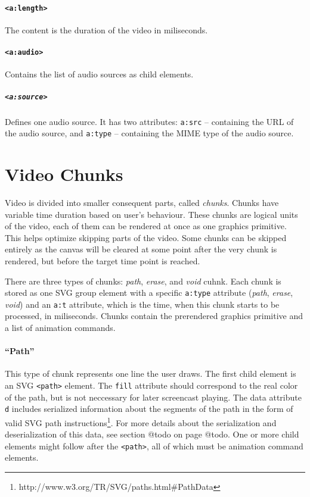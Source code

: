 \paragraph{\texttt{\textless a:length\textgreater}}
The content is the duration of the video in miliseconds.

\paragraph{\texttt{\textless a:audio\textgreater}}
Contains the list of audio sources as child elements.

\subparagraph{\texttt{\textless a:source\textgreater}}
Defines one audio source. It has two attributes: \verb|a:src| -- containing the URL of the audio source, and \verb|a:type| -- containing the MIME type of the audio source.

\section{Video Chunks}
Video is divided into smaller consequent parts, called \textit{chunks}. Chunks have variable time duration based on user's behaviour. These chunks are logical units of the video, each of them can be rendered at once as one graphics primitive. This helps optimize skipping parts of the video. Some chunks can be skipped entirely as the canvas will be cleared at some point after the very chunk is rendered, but before the target time point is reached.

There are three types of chunks: \textit{path}, \textit{erase}, and \textit{void} cuhnk. Each chunk is stored as one SVG group element with a specific \verb|a:type| attribute (\textit{path}, \textit{erase}, \textit{void}) and an \verb|a:t| attribute, which is the time, when this chunk starts to be processed, in miliseconds. Chunks contain the prerendered graphics primitive and a list of animation commands.

\paragraph{``Path''}
This type of chunk represents one line the user draws. The first child element is an SVG \verb|<path>| element. The \verb|fill| attribute should correspond to the real color of the path, but is not neccessary for later screencast playing. The data attribute \verb|d| includes serialized information about the segments of the path in the form of valid SVG path instructions\footnote{http://www.w3.org/TR/SVG/paths.html\#PathData}. For more details about the serialization and deserialization of this data, see section @todo on page @todo. One or more child elements might follow after the \verb|<path>|, all of which must be animation command elements.

